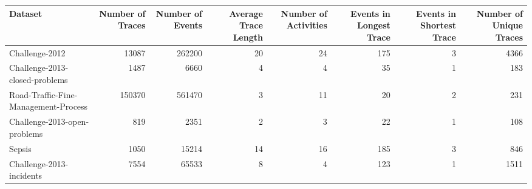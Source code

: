 \begin{tabular}{lrrrrrrr}
\toprule
Dataset & Number of Traces & Number of Events & Average Trace Length & Number of Activities & Events in Longest Trace & Events in Shortest Trace & Number of Unique Traces \\
\midrule
Challenge-2012 & 13087 & 262200 & 20 & 24 & 175 & 3 & 4366 \\
Challenge-2013-closed-problems & 1487 & 6660 & 4 & 4 & 35 & 1 & 183 \\
Road-Traffic-Fine-Management-Process & 150370 & 561470 & 3 & 11 & 20 & 2 & 231 \\
Challenge-2013-open-problems & 819 & 2351 & 2 & 3 & 22 & 1 & 108 \\
Sepsis & 1050 & 15214 & 14 & 16 & 185 & 3 & 846 \\
Challenge-2013-incidents & 7554 & 65533 & 8 & 4 & 123 & 1 & 1511 \\
\bottomrule
\end{tabular}
